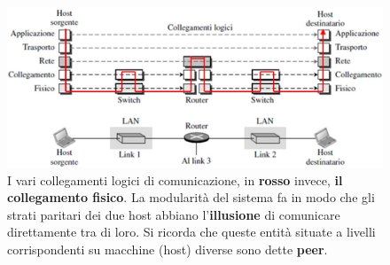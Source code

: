 \documentclass[11pt,a4paper]{article}
\theoremstyle{definition}
\begin{document}
\begin{figure}[!h]
	\includegraphics[scale=0.5]{Immagini/Logfis.png}
	\centering
	\caption{I vari collegamenti logici di comunicazione, in \textbf{rosso} invece, \textbf{il collegamento fisico}. La modularità del sistema fa in modo che gli strati paritari dei due host abbiano l'\textbf{illusione} di comunicare direttamente tra di loro. Si ricorda che queste entità situate a livelli corrispondenti su macchine (host) diverse sono dette \textbf{peer}.}
\end{figure}
\end{document}
